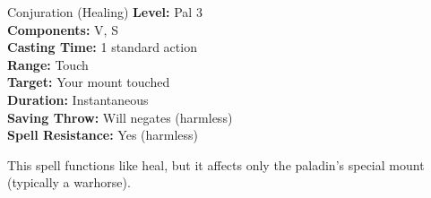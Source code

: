 {Conjuration (Healing)}
{
	\textbf{Level:}
	Pal 3\\
	\textbf{Components:}
	V, S\\
	\textbf{Casting Time:}
	1 standard action\\
	\textbf{Range:}
	Touch\\
	\textbf{Target:}
	Your mount touched\\
	\textbf{Duration:}
	Instantaneous\\
	\textbf{Saving Throw:}
	Will negates (harmless)\\
	\textbf{Spell Resistance:}
	Yes (harmless)\\
}
{
	This spell functions like heal, but it affects only the paladin's special mount (typically a warhorse).

}
